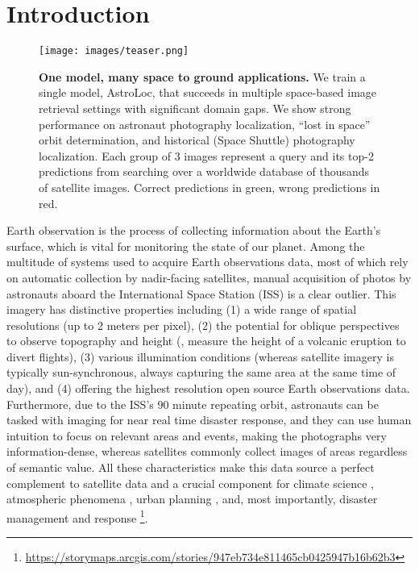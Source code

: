 
\section{Introduction}
\label{sec:intro}



\begin{figure}
    \begin{center}
    \texttt{[image: images/teaser.png]}
    \end{center}
    \vspace{-5mm}
    \caption{\textbf{One model, many space to ground applications.} We train a single model, AstroLoc, that succeeds in multiple space-based image retrieval settings with significant domain gaps.
    We show strong performance on astronaut photography localization, “lost in space” orbit determination, and historical (Space Shuttle) photography localization.
    Each group of 3 images represent a query and its top-2 predictions from searching over a worldwide database of thousands of satellite images. Correct predictions in green, wrong predictions in red.
    }
    \vspace{-5mm}
    \label{fig:teaser}
\end{figure}


Earth observation is the process of collecting information about the Earth's surface, which is vital for monitoring the state of our planet.
Among the multitude of systems used to acquire Earth observations data, most of which rely on automatic collection by nadir-facing satellites,
manual acquisition of photos by astronauts aboard the International Space Station (ISS) is a clear outlier.
This imagery has distinctive properties including (1) a wide range of spatial resolutions (up to 2 meters per pixel), (2) the potential for oblique perspectives to observe topography and height (\eg, measure the height of a volcanic eruption to divert flights), (3) various illumination conditions (whereas satellite imagery is typically sun-synchronous, always capturing the same area at the same time of day), and (4) offering the highest resolution open source Earth observations data.
Furthermore, due to the ISS's 90 minute repeating orbit, astronauts can be tasked with imaging for near real time disaster response, and they can use human intuition to focus on relevant areas and events, making the photographs very information-dense, whereas satellites commonly collect images of areas regardless of semantic value.
All these characteristics make this data source a perfect complement to satellite data and a crucial component for climate science \cite{astro_photos_climate_patterns}, atmospheric phenomena \cite{sprites, TLEs}, urban planning \cite{Sanchez_2022_artificial_lightning, Gaston_2022_environ_impacts_artificial_light, Small_2022_spectrometry_urban_lightscape, Schirmer_2019_nightlight_behavior}, and, most importantly, disaster management and response \cite{IDC_Stefanov}\footnote{\url{https://storymaps.arcgis.com/stories/947eb734e811465cb0425947b16b62b3}}.

